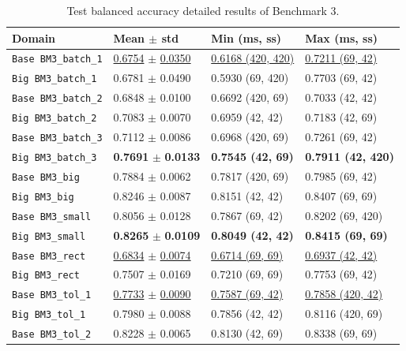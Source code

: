 \begin{table}[htbp]
    \centering
    \caption{Test balanced accuracy detailed results of Benchmark 3.}
    \label{tab:bm3_bal_acc_detail}
    \begin{tabular}{llll}
        \toprule
        \textbf{Domain} & \textbf{Mean $\pm$ std} & \textbf{Min (ms, ss)} & \textbf{Max (ms, ss)}\\
        \midrule

        \texttt{Base BM3\_batch\_1} & \underline{0.6754} $\pm$ \underline{0.0350} & \underline{0.6168 (420, 420)} & \underline{0.7211 (69, 42)}\\
        \texttt{Big BM3\_batch\_1} & 0.6781 $\pm$ 0.0490 & 0.5930 (69, 420) & 0.7703 (69, 42) \\
        \texttt{Base BM3\_batch\_2} & 0.6848 $\pm$ 0.0100 & 0.6692 (420, 69) & 0.7033 (42, 42)\\
        \texttt{Big BM3\_batch\_2} & 0.7083 $\pm$ 0.0070 & 0.6959 (42, 42) & 0.7183 (42, 69) \\
        \texttt{Base BM3\_batch\_3} & 0.7112 $\pm$ 0.0086 & 0.6968 (420, 69) & 0.7261 (69, 42)\\
        \texttt{Big BM3\_batch\_3} & \textbf{0.7691} $\pm$ \textbf{0.0133} & \textbf{0.7545 (42, 69)} & \textbf{0.7911 (42, 420)} \\
        \midrule
        \texttt{Base BM3\_big} & 0.7884 $\pm$ 0.0062 & 0.7817 (420, 69) & 0.7985 (69, 42)\\
        \texttt{Big BM3\_big} & 0.8246 $\pm$ 0.0087 & 0.8151 (42, 42) & 0.8407 (69, 69) \\
        \texttt{Base BM3\_small} & 0.8056 $\pm$ 0.0128 & 0.7867 (69, 42) & 0.8202 (69, 420)\\
        \texttt{Big BM3\_small} & \textbf{0.8265} $\pm$ \textbf{0.0109} & \textbf{0.8049 (42, 42)} & \textbf{0.8415 (69, 69)} \\
        \texttt{Base BM3\_rect} & \underline{0.6834} $\pm$ \underline{0.0074} & \underline{0.6714 (69, 69)} & \underline{0.6937 (42, 42)}\\
        \texttt{Big BM3\_rect} & 0.7507 $\pm$ 0.0169 & 0.7210 (69, 69) & 0.7753 (69, 42) \\
        \midrule
        \texttt{Base BM3\_tol\_1} & \underline{0.7733} $\pm$ \underline{0.0090} & \underline{0.7587 (69, 42)} & \underline{0.7858 (420, 42)}\\
        \texttt{Big BM3\_tol\_1} & 0.7980 $\pm$ 0.0088 & 0.7856 (42, 42) & 0.8116 (420, 69) \\
        \texttt{Base BM3\_tol\_2} & 0.8228 $\pm$ 0.0065 & 0.8130 (42, 69) & 0.8338 (69, 69)\\

\end{tabular}
\end{table}
